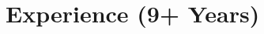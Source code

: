 \documentclass{subfiles}
\begin{document}
\section{Experience (9+ Years)}




\break



\end{document}
